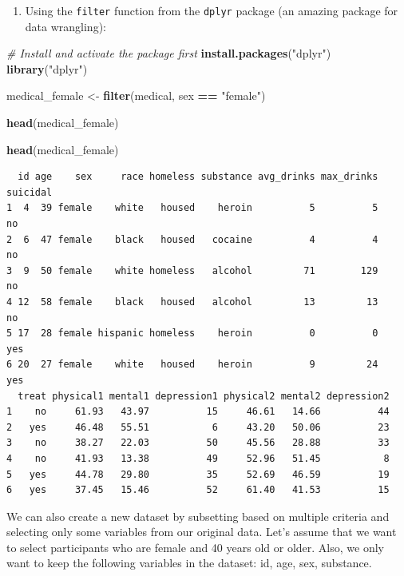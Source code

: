 \documentclass[]{book}
\newenvironment{Shaded}{\begin{snugshade}}{\end{snugshade}}
\newcommand{\CommentTok}[1]{\textcolor[rgb]{0.56,0.35,0.01}{\textit{#1}}}
\newcommand{\KeywordTok}[1]{\textcolor[rgb]{0.13,0.29,0.53}{\textbf{#1}}}
\newcommand{\NormalTok}[1]{#1}
\newcommand{\OperatorTok}[1]{\textcolor[rgb]{0.81,0.36,0.00}{\textbf{#1}}}
\newcommand{\StringTok}[1]{\textcolor[rgb]{0.31,0.60,0.02}{#1}}
\providecommand{\tightlist}{%
  \setlength{\itemsep}{0pt}\setlength{\parskip}{0pt}}
\begin{document}
\begin{enumerate}
\def\labelenumi{\arabic{enumi}.}
\setcounter{enumi}{2}
\tightlist
\item
  Using the \texttt{filter} function from the \texttt{dplyr} package (an amazing package for data wrangling):
\end{enumerate}

\begin{Shaded}
\begin{Highlighting}[]
\CommentTok{# Install and activate the package first}
\KeywordTok{install.packages}\NormalTok{(}\StringTok{"dplyr"}\NormalTok{)}
\KeywordTok{library}\NormalTok{(}\StringTok{"dplyr"}\NormalTok{)}

\NormalTok{medical_female <-}\StringTok{ }\KeywordTok{filter}\NormalTok{(medical, sex }\OperatorTok{==}\StringTok{ "female"}\NormalTok{)}

\KeywordTok{head}\NormalTok{(medical_female)}
\end{Highlighting}
\end{Shaded}

\begin{Shaded}
\begin{Highlighting}[]
\KeywordTok{head}\NormalTok{(medical_female)}
\end{Highlighting}
\end{Shaded}

\begin{verbatim}
  id age    sex     race homeless substance avg_drinks max_drinks suicidal
1  4  39 female    white   housed    heroin          5          5       no
2  6  47 female    black   housed   cocaine          4          4       no
3  9  50 female    white homeless   alcohol         71        129       no
4 12  58 female    black   housed   alcohol         13         13       no
5 17  28 female hispanic homeless    heroin          0          0      yes
6 20  27 female    white   housed    heroin          9         24      yes
  treat physical1 mental1 depression1 physical2 mental2 depression2
1    no     61.93   43.97          15     46.61   14.66          44
2   yes     46.48   55.51           6     43.20   50.06          23
3    no     38.27   22.03          50     45.56   28.88          33
4    no     41.93   13.38          49     52.96   51.45           8
5   yes     44.78   29.80          35     52.69   46.59          19
6   yes     37.45   15.46          52     61.40   41.53          15
\end{verbatim}

We can also create a new dataset by subsetting based on multiple criteria and selecting only some variables from our original data. Let's assume that we want to select participants who are female and 40 years old or older. Also, we only want to keep the following variables in the dataset: id, age, sex, substance.
\end{document}
